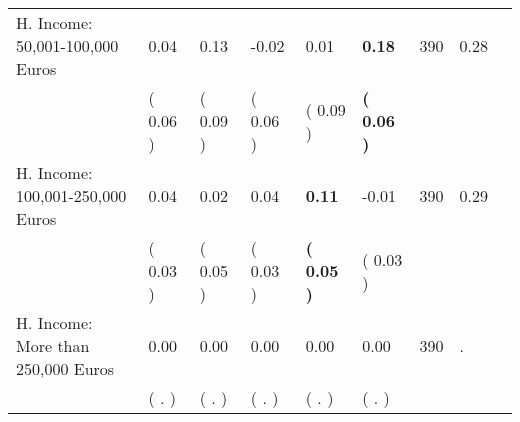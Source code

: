 \begin{tabular}{L{6.2cm} C{1.8cm} C{1.8cm} C{1.8cm} C{1.8cm} C{1.8cm} C{1.8cm} C{0.3cm} C{0.3cm}}
H. Income: 50,001-100,000 Euros &      0.04 &      0.13 &     -0.02 &      0.01 & \textbf{     0.18}  & 390 &       0.28 \\ 
 & (     0.06 ) & (     0.09 ) & (     0.06 ) & (     0.09 ) & \textbf{(     0.06 )}  & \\
H. Income: 100,001-250,000 Euros &      0.04 &      0.02 &      0.04 & \textbf{     0.11} &     -0.01  & 390 &       0.29 \\ 
 & (     0.03 ) & (     0.05 ) & (     0.03 ) & \textbf{(     0.05 )} & (     0.03 )  & \\
H. Income: More than 250,000 Euros &      0.00 &      0.00 &      0.00 &      0.00 &      0.00  & 390 &          . \\ 
 & (        . ) & (        . ) & (        . ) & (        . ) & (        . )  & \\
\bottomrule
\end{tabular}
